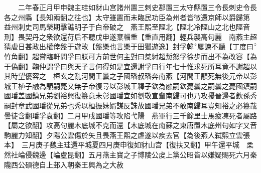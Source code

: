 　　二年春正月甲申魏主珪如豺山宫諸州置三刺史郡置三太守縣置三令長刺史令長各之州縣【長知兩翻之往也】太守雖置而未臨民功臣為州者皆徵還京師以爵歸第　益州刺史司馬榮期擊譙明子于白帝破之　燕王熙至陘北【陘北冷陘山之北也陘音刑】畏契丹之衆欲還苻后不聽戊申遂棄輜重【重直用翻】輕兵襲高句麗　南燕主超猜虐日甚政出權倖盤于遊畋【盤樂也言樂于田獵遊逸】封孚韓屢諫不聽【丁度曰竹角翻】超嘗臨軒問孚曰朕可方前世何主對曰桀紂超慙怒孚徐步而出不為改容【為于偽翻】鞠仲謂孚曰與天子言何得如是宜還謝孚曰行年七十惟求死所耳竟不謝超以其時望優容之　桓玄之亂河間王曇之子國璠叔璠奔南燕【河間王顒死無後元帝以彭城王植子融為顒嗣薨又無子帝復尋以彭城王釋子欽為融嗣欽薨曇之嗣曇之薨國鎮嗣國璠盖國鎮兄弟劉裕興復簒意未彰國璠宜如劉敬宣輩南歸可也乃攻擾晉邊者欽孫秀嗣封章武國璠從兄弟也秀以桓振妹婿謀反誅故國璠兄弟不敢南歸耳豈知裕之必簒哉曇徒含翻璠孚袁翻】二月甲戌國璠等攻陷弋陽　燕軍行三千餘里士馬疲凍死者屬路【屬之欲翻】攻高句麗木底城不克而還【木底城在南蘇之東唐置木底州句如字又音駒麗力知翻】夕陽公雲傷於矢且畏燕王熙之虐遂以疾去官【為後燕人弑熙立雲張本】　三月庚子魏主珪還平城夏四月庚申復如豺山宫【復扶又翻】甲午還平城　柔然社崘侵魏邊【崘盧昆翻】五月燕主寶之子博陵公䖍上黨公昭皆以嫌疑賜死六月秦隴西公碩德自上邽入朝秦王興為之大赦

